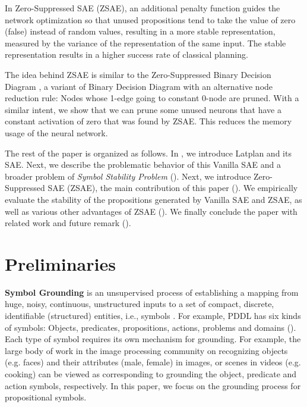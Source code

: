 In Zero-Suppressed SAE (ZSAE), an additional penalty function
guides the network optimization so that unused propositions tend to 
take the value of zero (false) instead of random values,
resulting in a more stable representation, measured by the variance of the representation of the same input.
The stable representation results in a higher success rate of classical planning.

The idea behind ZSAE is similar to the Zero-Suppressed Binary Decision Diagram \cite{minato1993zero},
a variant of Binary Decision Diagram \cite{bryant1986graph} with an alternative node reduction rule:
Nodes whose 1-edge going to constant 0-node are pruned.
With a similar intent, we show that we can prune some unused neurons
that have a constant activation of zero that was found by ZSAE.
This reduces the memory usage of the neural network.

The rest of the paper is organized as follows.
In , we introduce Latplan \cite{Asai2018} and its SAE.
Next, we describe the problematic behavior of this Vanilla SAE and
a broader problem of \emph{Symbol Stability Problem} ().
Next, we introduce Zero-Suppressed SAE (ZSAE), the main contribution of this paper ().
We empirically evaluate the stability of the propositions generated by Vanilla SAE and ZSAE,
as well as various other advantages of ZSAE ().
We finally conclude the paper with related work and future remark ().


\section{Preliminaries}
\label{background}

\textbf{Symbol Grounding} is an unsupervised process of establishing a mapping
from huge, noisy, continuous, unstructured inputs
to a set of compact, %
discrete, identifiable (structured) entities, i.e., symbols \cite{Asai2018}.
For example, PDDL has six kinds of symbols: Objects, predicates, propositions, actions, problems and domains ().
Each type of symbol requires its own mechanism for grounding.
For example, the large body of work in the image processing community on recognizing 
objects (e.g. faces) and their attributes (male, female) in images, or scenes in videos (e.g. cooking)
can be viewed as corresponding to grounding the object, predicate and action symbols, respectively.
In this paper, we focus on the grounding process for propositional symbols.


